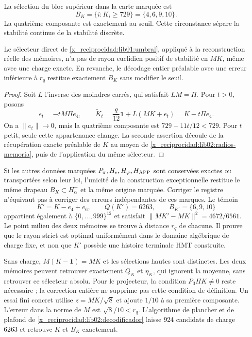 La sélection du bloc supérieur dans la carte marquée est
\begin{equation}
 B_K=\{i:K_i\geq729\}=\{4,6,9,10\}.
 \label{x_reciprocidad:lib01:umbral}
\end{equation}
La quatrième composante est exactement au seuil. Cette circonstance
sépare la stabilité continue de la stabilité discrète.

\begin{proposition}
\label{x_reciprocidad:lib01:umbral-estable}
Le sélecteur direct de \eqref{x_reciprocidad:lib01:umbral}, appliqué à la reconstruction réelle des mémoires, n'a pas de rayon euclidien positif de stabilité en \(MK\), même avec une charge exacte. En revanche, le décodage entier préalable avec une erreur inférieure à \(r_q\) restitue exactement \(B_K\) sans modifier le seuil.
\end{proposition}
\begin{proof}
Soit \(L\) l’inverse des moindres carrés, qui satisfait
\(LM=\Pi\). Pour \(t>0\), posons
\[
 e_t=-tM\Pi e_4,
 \qquad \widetilde K_t=\frac q{12}\mathbf1+L(MK+e_t)
 =K-t\Pi e_4.
\]
On a \(\|e_t\|\to0\), mais la quatrième composante est
\(729-11t/12<729\). Pour \(t\) petit, seule cette appartenance change.
La seconde assertion découle de la récupération exacte préalable de \(K\)
au moyen de \cref{x_reciprocidad:lib02:radios-memoria}, puis de l’application du même sélecteur.
\end{proof}

Si les autres données marquées \(P_\pi,H_e,H_\varphi,H_{\rm APP}\)
sont conservées exactes ou transportées selon leur loi, l’unicité de la
construction exceptionnelle restitue le même drapeau
\(B_K\subset H^-_\alpha\) et la même origine marquée. Corriger le
registre n’équivaut pas à corriger des erreurs indépendantes de ces marques.
Le témoin
\[
 K'=K-e_4+e_6,
 \qquad Q(K')=6263,\qquad B_{K'}=\{6,9,10\}
\]
appartient également à \(\{0,\ldots,999\}^{12}\) et satisfait \(\|MK'-MK\|^2=4672/6561\). Le point milieu des deux mémoires se trouve à distance \(r_q\) de chacune. Il prouve que le rayon strict est optimal uniformément dans le domaine algébrique de charge fixe, et non que \(K'\) possède une histoire terminale HMT construite.

Sans charge, \(M(K-\mathbf1)=MK\) et les sélections hautes sont distinctes.
Les deux mémoires peuvent retrouver exactement \(Q_K\) et \(\eta_K\),
qui ignorent la moyenne, sans retrouver ce sélecteur absolu. Pour le
projecteur, la condition \(P_3\Pi K\ne0\) reste nécessaire ;
la correction entière ne supprime pas cette condition de définition. Un essai
fini concret utilise \(z=MK/\sqrt8\) et ajoute \(1/10\) à sa première
composante. L’erreur dans la norme de \(M\) est \(\sqrt8/10<r_q\).
L’algorithme de plancher et de plafond de \cref{x_reciprocidad:lib02:decodificador} laisse 924
candidats de charge 6263 et retrouve \(K\) et \(B_K\) exactement.

